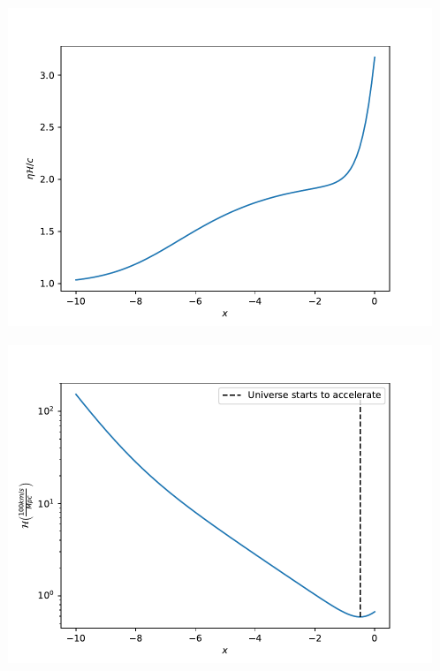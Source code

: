 \documentclass{aa}
\begin{document}
\begin{figure}[ht]
\centering
\includegraphics[width=\hsize]{figures/etaHp_over_c.pdf}
  \caption{}
     \label{}
\end{figure}

\begin{figure}[ht]
\centering
\includegraphics[width=\hsize]{figures/Hp.pdf}
  \caption{}
     \label{}
\end{figure}
\end{document}
